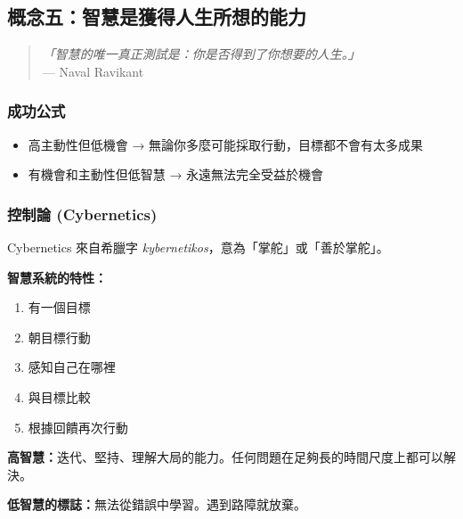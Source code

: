 \documentclass[12pt,a4paper]{article}
\begin{document}
\subsection{概念五：智慧是獲得人生所想的能力}

\begin{quote}
\textit{「智慧的唯一真正測試是：你是否得到了你想要的人生。」}\\
\hfill — Naval Ravikant
\end{quote}

\subsubsection{成功公式}

\begin{center}
\end{center}

\begin{itemize}
    \item 高主動性但低機會 → 無論你多麼可能採取行動，目標都不會有太多成果
    \item 有機會和主動性但低智慧 → 永遠無法完全受益於機會
\end{itemize}

\subsubsection{控制論 (Cybernetics)}

Cybernetics 來自希臘字 \textit{kybernetikos}，意為「掌舵」或「善於掌舵」。

\textbf{智慧系統的特性：}
\begin{enumerate}
    \item 有一個目標
    \item 朝目標行動
    \item 感知自己在哪裡
    \item 與目標比較
    \item 根據回饋再次行動
\end{enumerate}

\begin{tcolorbox}[colback=emergency_blue!5!white, colframe=emergency_blue, title=\textbf{高智慧 vs 低智慧}]
\textbf{高智慧：}迭代、堅持、理解大局的能力。任何問題在足夠長的時間尺度上都可以解決。

\textbf{低智慧的標誌：}無法從錯誤中學習。遇到路障就放棄。
\end{tcolorbox}
\end{document}
